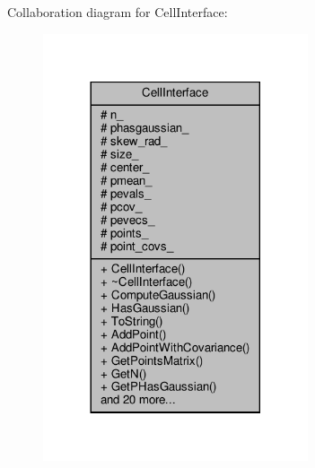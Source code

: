 Collaboration diagram for Cell\+Interface\+:\nopagebreak
\begin{figure}[H]
\begin{center}
\leavevmode
\includegraphics[width=221pt]{df/d02/classCellInterface__coll__graph}
\end{center}
\end{figure}
